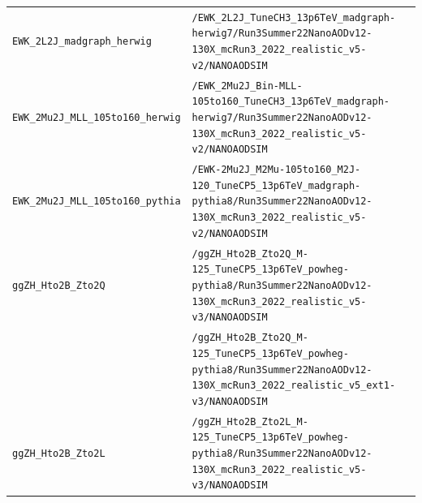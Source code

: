 \begin{longtable}{@{}>{\RaggedRight\arraybackslash}p{} >{\RaggedRight\arraybackslash}p{}@{}}
\addlinespace[2pt]
\texttt{EWK\_\allowbreak{}2L2J\_\allowbreak{}madgraph\_\allowbreak{}herwig} & \texttt{/\allowbreak{}EWK\_\allowbreak{}2L2J\_\allowbreak{}TuneCH3\_\allowbreak{}13p6TeV\_\allowbreak{}madgraph-\allowbreak{}herwig7/\allowbreak{}Run3Summer22NanoAODv12-\allowbreak{}130X\_\allowbreak{}mcRun3\_\allowbreak{}2022\_\allowbreak{}realistic\_\allowbreak{}v5-\allowbreak{}v2/\allowbreak{}NANOAODSIM} \\
\addlinespace[2pt]
\texttt{EWK\_\allowbreak{}2Mu2J\_\allowbreak{}MLL\_\allowbreak{}105to160\_\allowbreak{}herwig} & \texttt{/\allowbreak{}EWK\_\allowbreak{}2Mu2J\_\allowbreak{}Bin-\allowbreak{}MLL-\allowbreak{}105to160\_\allowbreak{}TuneCH3\_\allowbreak{}13p6TeV\_\allowbreak{}madgraph-\allowbreak{}herwig7/\allowbreak{}Run3Summer22NanoAODv12-\allowbreak{}130X\_\allowbreak{}mcRun3\_\allowbreak{}2022\_\allowbreak{}realistic\_\allowbreak{}v5-\allowbreak{}v2/\allowbreak{}NANOAODSIM} \\
\addlinespace[2pt]
\texttt{EWK\_\allowbreak{}2Mu2J\_\allowbreak{}MLL\_\allowbreak{}105to160\_\allowbreak{}pythia} & \texttt{/\allowbreak{}EWK-\allowbreak{}2Mu2J\_\allowbreak{}M2Mu-\allowbreak{}105to160\_\allowbreak{}M2J-\allowbreak{}120\_\allowbreak{}TuneCP5\_\allowbreak{}13p6TeV\_\allowbreak{}madgraph-\allowbreak{}pythia8/\allowbreak{}Run3Summer22NanoAODv12-\allowbreak{}130X\_\allowbreak{}mcRun3\_\allowbreak{}2022\_\allowbreak{}realistic\_\allowbreak{}v5-\allowbreak{}v2/\allowbreak{}NANOAODSIM} \\
\addlinespace[2pt]
\texttt{ggZH\_\allowbreak{}Hto2B\_\allowbreak{}Zto2Q} & \texttt{/\allowbreak{}ggZH\_\allowbreak{}Hto2B\_\allowbreak{}Zto2Q\_\allowbreak{}M-\allowbreak{}125\_\allowbreak{}TuneCP5\_\allowbreak{}13p6TeV\_\allowbreak{}powheg-\allowbreak{}pythia8/\allowbreak{}Run3Summer22NanoAODv12-\allowbreak{}130X\_\allowbreak{}mcRun3\_\allowbreak{}2022\_\allowbreak{}realistic\_\allowbreak{}v5-\allowbreak{}v3/\allowbreak{}NANOAODSIM} \\
 & \texttt{/\allowbreak{}ggZH\_\allowbreak{}Hto2B\_\allowbreak{}Zto2Q\_\allowbreak{}M-\allowbreak{}125\_\allowbreak{}TuneCP5\_\allowbreak{}13p6TeV\_\allowbreak{}powheg-\allowbreak{}pythia8/\allowbreak{}Run3Summer22NanoAODv12-\allowbreak{}130X\_\allowbreak{}mcRun3\_\allowbreak{}2022\_\allowbreak{}realistic\_\allowbreak{}v5\_\allowbreak{}ext1-\allowbreak{}v3/\allowbreak{}NANOAODSIM} \\
\addlinespace[2pt]
\texttt{ggZH\_\allowbreak{}Hto2B\_\allowbreak{}Zto2L} & \texttt{/\allowbreak{}ggZH\_\allowbreak{}Hto2B\_\allowbreak{}Zto2L\_\allowbreak{}M-\allowbreak{}125\_\allowbreak{}TuneCP5\_\allowbreak{}13p6TeV\_\allowbreak{}powheg-\allowbreak{}pythia8/\allowbreak{}Run3Summer22NanoAODv12-\allowbreak{}130X\_\allowbreak{}mcRun3\_\allowbreak{}2022\_\allowbreak{}realistic\_\allowbreak{}v5-\allowbreak{}v3/\allowbreak{}NANOAODSIM} \\

\end{longtable}
